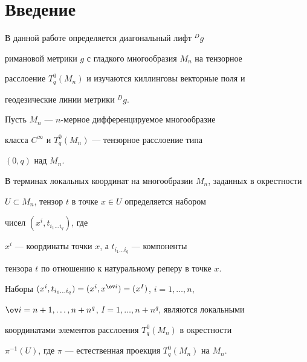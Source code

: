 

\maketitle


\label{begin}











\section{Введение}





В данной работе определяется диагональный лифт ${}^{D}g$


римановой метрики $g$ с гладкого многообразия $M_n$ на тензорное


расслоение $T^0_q(M_n)$ и изучаются киллинговы векторные поля и


геодезические линии метрики ${}^Dg$.





Пусть $M_n$ --- $n$-мерное дифференцируемое многообразие


класса $C^\infty$ и $T^0_q(M_n)$ --- тензорное расслоение  типа


$(0,q)$ над $M_n$.


В терминах локальных координат на многообразии $M_n$, заданных в окрестности


$U\subset M_n$, тензор  $t$  в точке $x\in U$ определяется набором


чисел $(x^i,t_{i_1\dotsc i_q})$, где


$x^i$ --- координаты точки $x$, а $t_{i_1\dotsc i_q}$ --- компоненты


тензора $t$ по отношению к натуральному реперу в точке  $x$.


Наборы $(x^i,t_{i_1\dotsc i_q})= (x^i,x^{\ov


i})=(x^I)$, $i=1,\dotsc,n$,


${\ov i}=n+1,\dotsc,n+n^q$, $I=1,\dotsc,n+n^q$, являются локальными


координатами элементов расслоения $T^0_q(M_n)$ в окрестности


$\pi^{-1}(U)$, где $\pi$ --- естественная проекция $T^0_q(M_n)$ на $M_n$.





